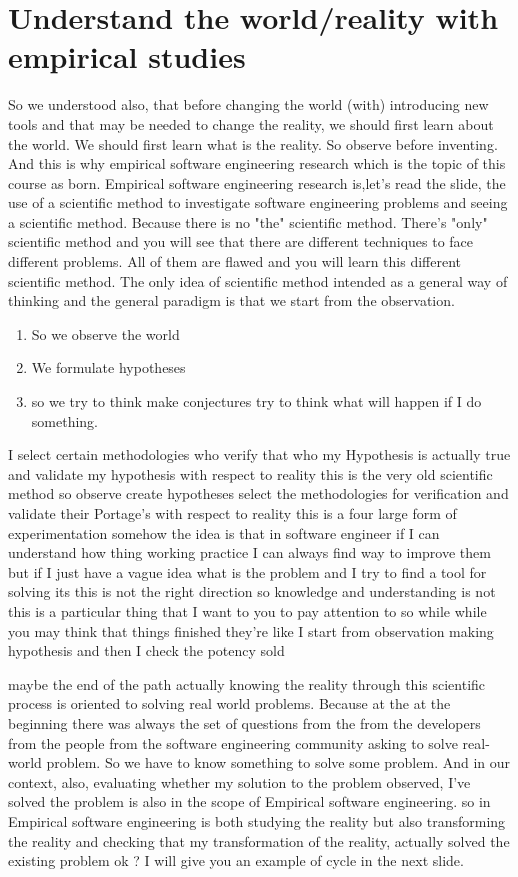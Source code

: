 \documentclass[conference, compsoc, twoside]{IEEEtran}
\begin{document}
\section{Understand the world/reality with empirical studies} %
\label{sec:understand_the_world}
 So we understood also, that before changing the world (with) introducing new tools and that may be needed to change the reality, we should first learn about the world.
 We should first learn what is the reality. So observe before inventing.
 And this is why empirical software engineering research which is the topic of this course as born.
 Empirical software engineering research is,let's read the slide, the use of a scientific method to investigate software engineering problems and seeing a scientific method.
 Because there is no "the" scientific method. 
 There's "only" scientific method and you will see that there are different techniques to face different problems.
 All of them are flawed and you will learn this different scientific method.
 The only idea of scientific method intended as a general way of thinking and the general paradigm is that we start from the observation. 
 \begin{enumerate}
 	\item So we observe the world
 	\item We formulate hypotheses
 	\item so we try to think make conjectures try to think what will happen if I do something.
 \end{enumerate}
   
 I select certain methodologies who verify that who my Hypothesis is actually true and validate my hypothesis with respect to reality this is the very old scientific method so observe create hypotheses select the methodologies for verification and validate their Portage's with respect to reality this is a four large form of experimentation somehow the idea is that in software engineer if I can understand how thing working practice I can always find way to improve them but if I just have a vague idea what is the problem and I try to find a tool for solving its this is not the right direction so knowledge and understanding is not this is a particular thing that I want to you to pay attention to so while while you may think that things finished they're like I start from observation making hypothesis and then I check the potency sold 

 maybe the end of the path actually knowing the reality through this scientific process is oriented to solving real world problems.
 Because at the at the beginning there was always the set of questions from the from the developers from the people from the software engineering community asking to solve real-world problem.
 So we have to know something to solve some problem.
 And in our context, also, evaluating whether my solution to the problem observed, I've solved the problem is also in the scope of Empirical software engineering.
 so in Empirical software engineering is both studying the reality but also transforming the reality and checking that my transformation of the reality, actually solved the existing problem ok ? 
 I will give you an example of cycle in the next slide. 
\end{document}

